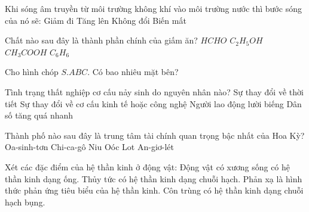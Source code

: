 \begin{ex}
    Khi sóng âm truyền từ môi trường không khí vào môi trường nước thì bước sóng của nó sẽ:
    \choice
    {Giảm đi}
    {\True Tăng lên}
    {Không đổi}
    {Biến mất}
\end{ex}

\begin{ex}
    Chất nào sau đây là thành phần chính của giấm ăn?
    \choice
    {$HCHO$}
    {$C_2H_5OH$}
    {\True $CH_3COOH$}
    {$C_6H_6$}
\end{ex}

\begin{ex}
    Cho hình chóp $S.ABC$. Có bao nhiêu mặt bên?
\end{ex}

\begin{ex}
    Tình trạng thất nghiệp cơ cấu nảy sinh do nguyên nhân nào?
    \choice
    {Sự thay đổi về thời tiết}
    {\True Sự thay đổi về cơ cấu kinh tế hoặc công nghệ}
    {Người lao động lười biếng}
    {Dân số tăng quá nhanh}
\end{ex}

\begin{ex}
    Thành phố nào sau đây là trung tâm tài chính quan trọng bậc nhất của Hoa Kỳ?
    \choice
    {Oa-sinh-tơn}
    {Chi-ca-gô}
    {\True Niu Oóc}
    {Lot An-giơ-lét}
\end{ex}

\begin{ex}
    Xét các đặc điểm của hệ thần kinh ở động vật:
    \choiceTF
    {\True Động vật có xương sống có hệ thần kinh dạng ống.}
    {Thủy tức có hệ thần kinh dạng chuỗi hạch.}
    {\True Phản xạ là hình thức phản ứng tiêu biểu của hệ thần kinh.}
    {\True Côn trùng có hệ thần kinh dạng chuỗi hạch bụng.}
\end{ex}

